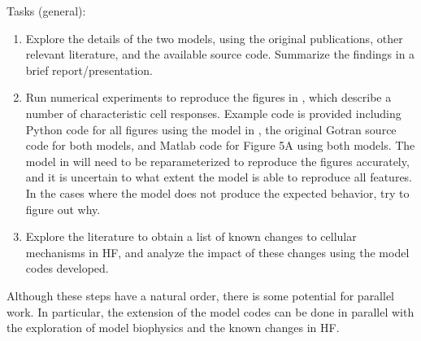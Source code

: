 \documentclass[epsfig,11pt]{article}
\begin{document}
\begin{description}
\item{Tasks (general):}
\begin{enumerate}
\item Explore the details of the two models, using the original publications, other relevant literature, and the available source code. Summarize the findings in a brief report/presentation.
\item Run numerical experiments to reproduce the figures in \cite{Rice:2008jd}, which describe a number of characteristic cell responses. Example code is provided including Python code for all figures using the model in \cite{Rice:2008jd}, the original Gotran source code for both models, and Matlab code for Figure 5A using both models. The model in \cite{Sachse:2003} will need to be reparameterized to reproduce the figures accurately, and it is uncertain to what extent the model is able to reproduce all features. In the cases where the model does not produce the expected behavior, try to figure out why.
\item Explore the literature to obtain a list of known changes to cellular mechanisms in HF, and analyze the impact of these changes using the model codes developed. 
\end{enumerate}
Although these steps have a natural order, there is some potential for parallel work. In particular, the extension of the model codes can be done in parallel with the exploration of model biophysics and the known changes in HF.

\end{description}



\end{document}

